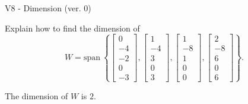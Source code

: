\begin{exercise}
  \begin{exerciseTitle}V8 - Dimension (ver. 0)\end{exerciseTitle}
  \begin{exerciseStatement}
    Explain how to find the dimension of 
\[W=\mathrm{span}\ \left\{\left[\begin{array}{r}
0 \\
-4 \\
-2 \\
0 \\
-3
\end{array}\right] , \left[\begin{array}{r}
1 \\
-4 \\
3 \\
0 \\
3
\end{array}\right] , \left[\begin{array}{r}
1 \\
-8 \\
1 \\
0 \\
0
\end{array}\right] , \left[\begin{array}{r}
2 \\
-8 \\
6 \\
0 \\
6
\end{array}\right]\right\}.\]



  \end{exerciseStatement}
  \begin{exerciseAnswer}
   The dimension of \(W\) is  \(2\).
  


  \end{exerciseAnswer}
\end{exercise}